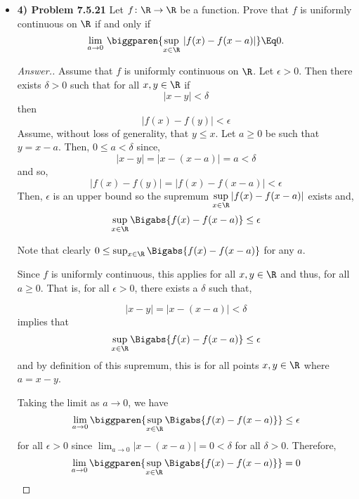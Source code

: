 \documentclass[10pt,twoside]{article}
\begin{document}
\begin{itemize}
\begin{itemize}
\begin{proof}[Answer to part (b)]
        Therefore, we have shown that $f$ is uniformly continuous on $\R$.
        \end{proof}
        
        \newpage
        
        \item\begin{proof}[Answer to part (c)]
        
        Consider the function $f:\R\to\R$ defined as
        \[f(x) = \frac{1}{x^2 + 1}\]
        
        \end{proof}
        
    \end{itemize}
    
    \pagebreak
    
    \item\textbf{4) Problem 7.5.21} \newline
    \noindent\makebox[\linewidth]{\rule{18cm}{0.4pt}}
    Let $f \colon \R \to \R$ be a function.
    Prove that $f$ is uniformly continuous on $\R$ if and only if
    $$\lim_{a \to 0} \, \biggparen{\sup_{x \in \R} \, |f(x) - f(x-a)|} \Eq 0.$$
    
    \begin{proof}[Answer.]
    Assume that $f$ is uniformly continuous on $\R$. Let $\epsilon > 0$. Then there exists $\delta > 0$ such that for all $x,y\in \R$ if
    \[|x-y|<\delta\]
    then 
    \[|f(x) - f(y)| < \epsilon\]
    Assume, without loss of generality, that $y\leq x$. Let $a\geq 0$ be such that $y = x-a$. Then, $0\leq a<\delta$ since,
    \[|x-y| = |x - (x-a)| = a < \delta\] and so,
    \[|f(x) - f(y)| = |f(x) - f(x-a)| < \epsilon\]
    Then, $\epsilon$ is an upper bound so the supremum $\displaystyle \sup_{x\in\R}|f(x) - f(x-a)|$ exists and,
    \[\sup_{x\in\R}\Bigabs{f(x) - f(x-a)} \leq \epsilon\]
    
    Note that clearly $0\leq \sup_{x\in\R}\Bigabs{f(x) - f(x-a)}$ for any $a$.
    
    Since $f$ is uniformly continuous, this applies for all $x,y\in\R$ and thus, for all $a\geq 0$. That is, for all $\epsilon > 0$, there exists a $\delta$ such that,
    
    \[|x - y| = |x - (x-a)| < \delta\]
    implies that
    \[\sup_{x\in\R}\Bigabs{f(x) - f(x-a)} \leq \epsilon\]
    and by definition of this supremum, this is for all points $x,y\in\R$ where $a = x - y$.
    
    Taking the limit as $a\to 0$, we have
    \[\lim_{a\to 0}\biggparen{\sup_{x\in\R}\Bigabs{f(x) - f(x-a)}}\leq \epsilon\]
    for all $\epsilon > 0$ since $\lim_{a\to 0}|x - (x-a)| = 0< \delta$ for all $\delta > 0$. Therefore,
    \[\lim_{a\to 0}\biggparen{\sup_{x\in\R}\Bigabs{f(x) - f(x-a)}} = 0\]\smallskip
    

\end{proof}
\end{itemize}
\end{document}
